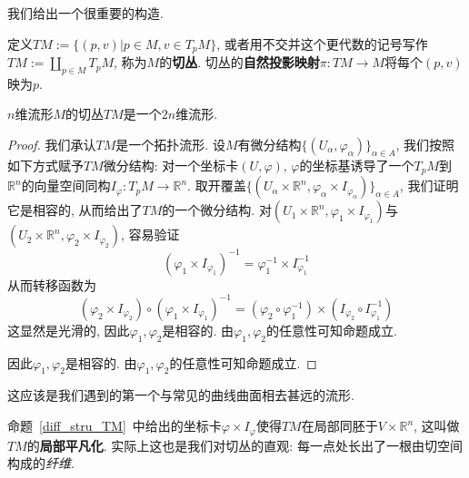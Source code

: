 我们给出一个很重要的构造.

\begin{defn}
    定义$TM:=\{(p,v)|p\in M,v\in T_pM\}$, 或者用不交并这个更代数的记号写作$\displaystyle TM:=\coprod_{p\in M}T_pM$, 称为$M$的\textbf{切丛}.
    切丛的\textbf{自然投影映射}$\pi:TM\to M$将每个$(p,v)$映为$p$.
\end{defn}

\begin{prop}\label{diff_stru_TM}
    $n$维流形$M$的切丛$TM$是一个$2n$维流形.
\end{prop}
\begin{proof}
    我们承认$TM$是一个拓扑流形.
    设$M$有微分结构$\{(U_\alpha,\varphi_\alpha)\}_{\alpha\in A}$, 我们按照如下方式赋予$TM$微分结构:
    对一个坐标卡$(U,\varphi)$, $\varphi$的坐标基诱导了一个$T_pM$到$\mathbb{R}^n$的向量空间同构$I_\varphi:T_pM\to\mathbb{R}^n$.
    取开覆盖$\{(U_\alpha\times\mathbb{R}^n,\varphi_\alpha\times I_{\varphi_\alpha})\}_{\alpha\in A}$, 我们证明它是相容的, 从而给出了$TM$的一个微分结构.
    对$(U_1\times\mathbb{R}^n,\varphi_1\times I_{\varphi_1})$与$(U_2\times\mathbb{R}^n,\varphi_2\times I_{\varphi_2})$, 容易验证
    \[(\varphi_1\times I_{\varphi_1})^{-1}=\varphi_1^{-1}\times I_{\varphi_1}^{-1}\]
    从而转移函数为
    \[(\varphi_2\times I_{\varphi_2})\circ(\varphi_1\times I_{\varphi_1})^{-1}=(\varphi_2\circ\varphi_1^{-1})\times(I_{\varphi_2}\circ I_{\varphi_1}^{-1})\]
    这显然是光滑的, 因此$\varphi_1,\varphi_2$是相容的.
    由$\varphi_1,\varphi_2$的任意性可知命题成立.
    
    因此$\varphi_1,\varphi_2$是相容的.
    由$\varphi_1,\varphi_2$的任意性可知命题成立.
\end{proof}

这应该是我们遇到的第一个与常见的曲线曲面相去甚远的流形.

\begin{rem}
    命题~\ref{diff_stru_TM}~中给出的坐标卡$\varphi\times I_\varphi$使得$TM$在局部同胚于$V\times\mathbb{R}^n$, 这叫做$TM$的\textbf{局部平凡化}.\label{local trivialization}
    实际上这也是我们对切丛的直观: 每一点处长出了一根由切空间构成的\textit{纤维}.
\end{rem}

